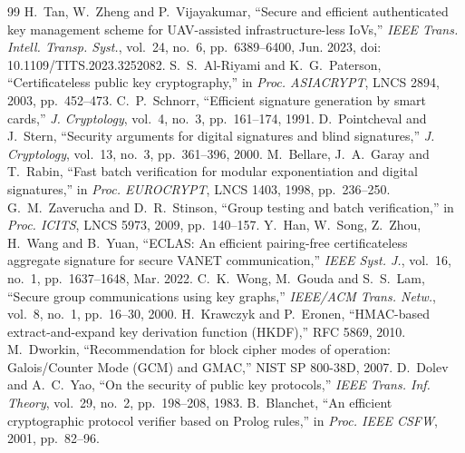\begin{thebibliography}{99}\small
{} H.~Tan, W.~Zheng and P.~Vijayakumar, ``Secure and efficient authenticated key management scheme for UAV-assisted infrastructure-less IoVs,''
  \emph{IEEE Trans. Intell. Transp. Syst.}, vol.~24, no.~6, pp.~6389--6400, Jun. 2023, doi: 10.1109/TITS.2023.3252082.
 S.~S.~Al-Riyami and K.~G.~Paterson, ``Certificateless public key cryptography,'' in \emph{Proc. ASIACRYPT}, LNCS 2894, 2003, pp.~452--473.
 C.~P.~Schnorr, ``Efficient signature generation by smart cards,'' \emph{J. Cryptology}, vol.~4, no.~3, pp.~161--174, 1991.
 D.~Pointcheval and J.~Stern, ``Security arguments for digital signatures and blind signatures,'' \emph{J. Cryptology}, vol.~13, no.~3, pp.~361--396, 2000.
 M.~Bellare, J.~A.~Garay and T.~Rabin, ``Fast batch verification for modular exponentiation and digital signatures,'' in \emph{Proc. EUROCRYPT}, LNCS 1403, 1998, pp.~236--250.
 G.~M.~Zaverucha and D.~R.~Stinson, ``Group testing and batch verification,'' in \emph{Proc. ICITS}, LNCS 5973, 2009, pp.~140--157.
 Y.~Han, W.~Song, Z.~Zhou, H.~Wang and B.~Yuan, ``ECLAS: An efficient pairing-free certificateless aggregate signature for secure VANET communication,''
  \emph{IEEE Syst. J.}, vol.~16, no.~1, pp.~1637--1648, Mar. 2022.
 C.~K.~Wong, M.~Gouda and S.~S.~Lam, ``Secure group communications using key graphs,'' \emph{IEEE/ACM Trans. Netw.}, vol.~8, no.~1, pp.~16--30, 2000.
 H.~Krawczyk and P.~Eronen, ``HMAC-based extract-and-expand key derivation function (HKDF),'' RFC 5869, 2010.
 M.~Dworkin, ``Recommendation for block cipher modes of operation: Galois/Counter Mode (GCM) and GMAC,'' NIST SP 800-38D, 2007.
 D.~Dolev and A.~C.~Yao, ``On the security of public key protocols,'' \emph{IEEE Trans. Inf. Theory}, vol.~29, no.~2, pp.~198--208, 1983.
 B.~Blanchet, ``An efficient cryptographic protocol verifier based on Prolog rules,'' in \emph{Proc. IEEE CSFW}, 2001, pp.~82--96.
\end{thebibliography}
